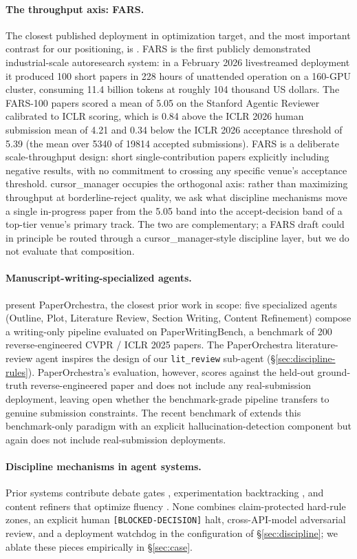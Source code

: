 \paragraph{The throughput axis: FARS.}
The closest published deployment in optimization target, and the
most important contrast for our positioning, is
\citet{fars2026analemma}. FARS is the first publicly demonstrated
industrial-scale autoresearch system: in a February 2026 livestreamed
deployment it produced 100 short papers in 228 hours of unattended
operation on a 160-GPU cluster, consuming 11.4 billion tokens at
roughly 104 thousand US dollars. The FARS-100 papers scored a mean
of 5.05 on the Stanford Agentic Reviewer calibrated to ICLR scoring,
which is 0.84 above the ICLR 2026 human submission mean of 4.21 and
0.34 below the ICLR 2026 acceptance threshold of 5.39 (the mean over
5340 of 19814 accepted submissions). FARS is a deliberate
scale-throughput design: short single-contribution papers explicitly
including negative results, with no commitment to crossing any
specific venue's acceptance threshold. cursor\_manager occupies the
orthogonal axis: rather than maximizing throughput at
borderline-reject quality, we ask what discipline mechanisms move a
single in-progress paper from the 5.05 band into the accept-decision
band of a top-tier venue's primary track. The two are complementary;
a FARS draft could in principle be routed through a
cursor\_manager-style discipline layer, but we do not evaluate that
composition.

\paragraph{Manuscript-writing-specialized agents.}
\citet{song2026paperorchestra} present PaperOrchestra, the closest
prior work in scope: five specialized agents (Outline, Plot, Literature
Review, Section Writing, Content Refinement) compose a writing-only
pipeline evaluated on PaperWritingBench, a benchmark of 200
reverse-engineered CVPR / ICLR 2025 papers. The PaperOrchestra
literature-review agent inspires the design of our
\texttt{lit\_review} sub-agent
(\S\ref{sec:discipline-rules}).
PaperOrchestra's evaluation, however, scores against the held-out
ground-truth reverse-engineered paper and does not include any
real-submission deployment, leaving open whether the benchmark-grade
pipeline transfers to genuine submission constraints. The recent
benchmark of \citet{miyai2026paperreconstruction} extends this
benchmark-only paradigm with an explicit hallucination-detection
component but again does not include real-submission deployments.

\paragraph{Discipline mechanisms in agent systems.}
Prior systems contribute debate gates \citep{sibyl2026system},
experimentation backtracking \citep{yamada2025aiscientistv2}, and
content refiners that optimize fluency \citep{song2026paperorchestra}.
None combines claim-protected hard-rule zones, an explicit human
\texttt{[BLOCKED-DECISION]} halt, cross-API-model adversarial review, and
a deployment watchdog in the configuration of \S\ref{sec:discipline}; we
ablate these pieces empirically in \S\ref{sec:case}.
